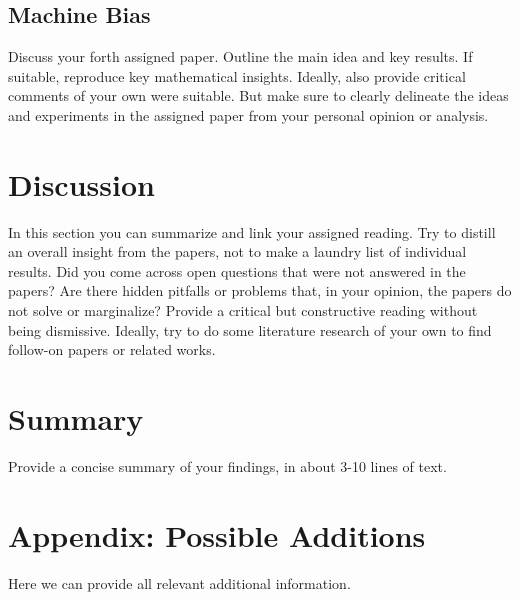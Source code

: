 \documentclass{article}
\begin{document}
\subsection{Machine Bias}

Discuss your forth assigned paper. Outline the main idea and key results. If suitable, reproduce key mathematical insights. Ideally, also provide critical comments of your own were suitable. But make sure to clearly delineate the ideas and experiments in the assigned paper from your personal opinion or analysis.

\section{Discussion}

In this section you can summarize and link your assigned reading. Try to distill an overall insight from the papers, not to make a laundry list of individual results. Did you come across open questions that were not answered in the papers? Are there hidden pitfalls or problems that, in your opinion, the papers do not solve or marginalize? Provide a critical but constructive reading without being dismissive. Ideally, try to do some literature research of your own to find follow-on papers or related works. 

\section{Summary}

Provide a concise summary of your findings, in about 3-10 lines of text.

\section{Appendix: Possible Additions}
Here we can provide all relevant additional information.

\medskip
\small


\end{document}
